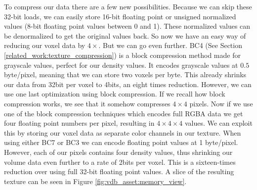 To compress our data there are a few new possibilities. Because we can skip these 32-bit loads, we can easily store 16-bit floating point or unsigned normalized values (8-bit floating point values between 0 and 1). These normalized values can be denormalized to get the original values back. So now we have an easy way of reducing our voxel data by $4\times$. But we can go even further. BC4 (See Section \ref{related_work:texture_compression}) is a block compression method made for grayscale values, perfect for our density values. It encodes grayscale values at $0.5$ byte/pixel, meaning that we can store two voxels per byte. This already shrinks our data from 32bit per voxel to 4bits, an eight times reduction. However, we can use one last optimization using block compression. If we recall how block compression works, we see that it somehow compresses $4\times 4$ pixels. Now if we use one of the block compression techniques which encodes full RGBA data we get four floating point numbers per pixel, resulting in $4 \times 4 \times 4$ values. We can exploit this by storing our voxel data as separate color channels in our texture. When using either BC7 or BC3 we can encode floating point values at 1 byte/pixel. However, each of our pixels contains four density values, thus shrinking our volume data even further to a rate of 2bits per voxel. This is a sixteen-times reduction over using full 32-bit floating point values. A slice of the resulting texture can be seen in Figure \ref{fig:vdb_asset:memory_view}.

